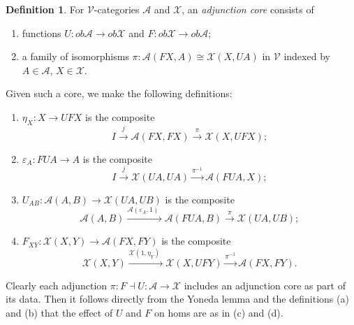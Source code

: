 \documentclass{amsart}
\theoremstyle{definition}
\newtheorem{definition}[theorem]{Definition}
\theoremstyle{remark}
\numberwithin{equation}{section}
\begin{document}
\begin{definition}

For $\mathcal{V}$-categories $\mathcal{A}$ and $\mathcal{X}$, an
{\itshape adjunction core} consists of
\begin{enumerate}
\item functions $U:\mathit{ob}\mathcal{A}\longrightarrow \mathit{ob}\mathcal{X}$
and $F:\mathit{ob}\mathcal{X}\longrightarrow \mathit{ob}\mathcal{A}$;\ \ 
\item a family of isomorphisms $\pi :\mathcal{A}( F X,A) \cong \mathcal{X}(
X,U A) $ in $\mathcal{V}$ indexed by $A\in \mathcal{A}$, $X\in \mathcal{X}$.
\end{enumerate}
\end{definition}


Given such a core, we make the following definitions:
\begin{enumerate}
\item  $\eta _{X}:X\longrightarrow U F X$ is the composite
\[
I\overset{j}{\longrightarrow }\mathcal{A}( F X,F X) \overset{\pi
}{\longrightarrow }\mathcal{X}( X,U F X) ;
\]
\item  $\varepsilon _{A}:F U A\longrightarrow A$ is the composite
\[
I\overset{j}{\longrightarrow }\mathcal{X}( U A,U A) \overset{\pi
^{-1}}{\longrightarrow }\mathcal{A}( F U A,X) ;
\]
\item  $U_{A B}:\mathcal{A}( A,B) \longrightarrow \mathcal{X}( U
A,U B) $ is the composite
\[
\mathcal{A}( A,B) \overset{\mathcal{A}( \varepsilon _{A},1) \ \ }{\longrightarrow
}\mathcal{A}( F U A,B) \overset{\pi }{\longrightarrow }\mathcal{X}(
U A,U B) ;
\]
\item  $F_{X Y}:\mathcal{X}( X,Y) \longrightarrow \mathcal{A}( F
X,F Y) $ is the composite
\[
\mathcal{X}( X,Y) \overset{\mathcal{X}( 1,\eta _{Y}) \ \ }{\longrightarrow
}\mathcal{X}( X,U F Y) \overset{\pi ^{-1}}{\longrightarrow }\mathcal{A}(
F X,F Y) .
\]
\end{enumerate}



Clearly each adjunction $\pi :F\dashv U:\mathcal{A}\longrightarrow
\mathcal{X}$ includes an adjunction core as part of its data. Then
it follows directly from the Yoneda lemma and the definitions (a)
and (b) that the effect of $U$ and $F$ on homs are as in (c) and
(d).
\end{document}
